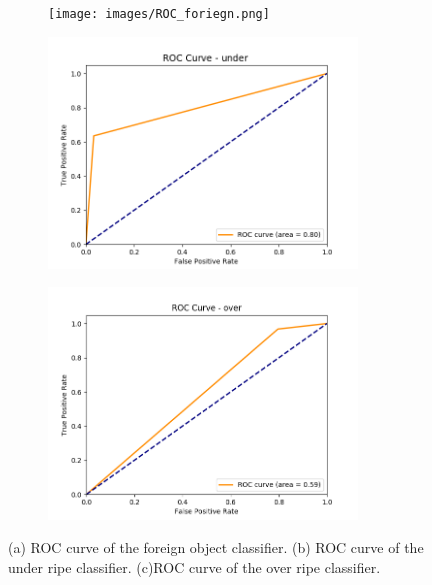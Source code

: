 \documentclass[fleqn,twoside,12pt]{report}
\begin{document}
\begin{figure}[ht]
	\centering
	\begin{subfigure}{0.5\linewidth}
		\centering
		\texttt{[image: images/ROC\_foriegn.png]}
		\caption{}
		\label{fig:ROC_f}
	\end{subfigure}%
	\begin{subfigure}{0.5\linewidth}
		\centering
		\includegraphics[width=0.9\textwidth]{images/ROC_under.png}
		\caption{}
		\label{fig:ROC_u}
	\end{subfigure}%
	
	\begin{subfigure}{0.5\linewidth}
		\centering
		\includegraphics[width=0.9\textwidth]{images/ROC_over.png}
		\caption{}
		\label{fig:ROC_o}
	\end{subfigure}%
	
	\caption{(a) ROC curve of the foreign object classifier. (b) ROC curve of the under ripe classifier. (c)ROC curve of the over ripe classifier.}
	\label{fig:ROCs}
\end{figure}
\end{document}
